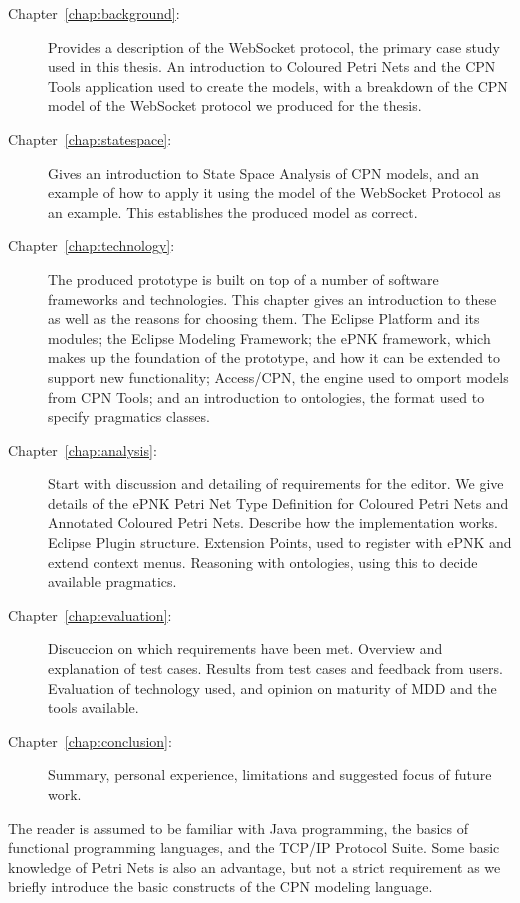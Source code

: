 \begin{description}
\item[Chapter~\ref{chap:background}:~] Provides a
description of the WebSocket protocol, the primary case study used in this thesis. An
introduction to Coloured Petri Nets and the CPN Tools application used to
create the models, with a breakdown of the CPN model of the WebSocket protocol
we produced for the thesis.
\item[Chapter~\ref{chap:statespace}:~] Gives an
introduction to State Space Analysis of CPN models, and an example of how to
apply it using the model of the WebSocket Protocol as an example. This
establishes the produced model as correct. 
\item [Chapter~\ref{chap:technology}:~] The produced
prototype is built on top of a number of software frameworks and technologies.
This chapter gives an introduction to these as well as the reasons for choosing them.
The Eclipse Platform and its modules; the Eclipse Modeling Framework; the ePNK
framework, which makes up the foundation of the prototype, and how it can be
extended to support new functionality; Access/CPN, the engine used
to omport models from CPN Tools; and an introduction to ontologies, the format
used to specify pragmatics classes.
\item [Chapter~\ref{chap:analysis}:~] Start with
discussion and detailing of requirements for the editor. 
We give details of the ePNK Petri Net Type Definition for Coloured Petri Nets and
Annotated Coloured Petri Nets. Describe how the implementation works.
Eclipse Plugin structure. Extension Points, used to register with ePNK
and extend context menus. Reasoning with ontologies, using this to decide
available pragmatics.
\item [Chapter~\ref{chap:evaluation}:~] Discuccion on
which requirements have been met. Overview and explanation of test cases.
Results from test cases and feedback from users. Evaluation of technology used,
and opinion on maturity of MDD and the tools available.
\item [Chapter~\ref{chap:conclusion}:~] Summary,
personal experience, limitations and suggested focus of future work.
\end{description} 


The reader is assumed to be familiar with Java programming, the basics of
functional programming languages, and the TCP/IP Protocol Suite. Some basic
knowledge of Petri Nets is also an advantage, but not a strict requirement as we
briefly introduce the basic constructs of the CPN modeling language.
